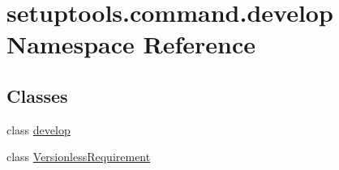 \hypertarget{namespacesetuptools_1_1command_1_1develop}{}\section{setuptools.\+command.\+develop Namespace Reference}
\label{namespacesetuptools_1_1command_1_1develop}
\subsection*{Classes}
\begin{DoxyCompactItemize}
\item 
class \hyperlink{classsetuptools_1_1command_1_1develop_1_1develop}{develop}
\item 
class \hyperlink{classsetuptools_1_1command_1_1develop_1_1_versionless_requirement}{Versionless\+Requirement}
\end{DoxyCompactItemize}
